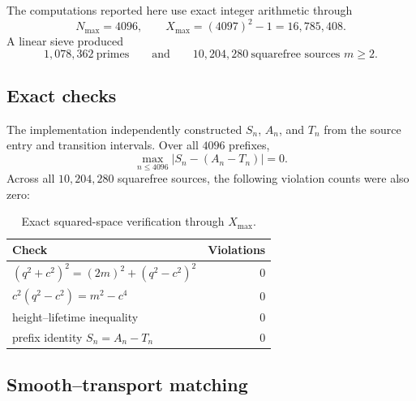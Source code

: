 \documentclass[11pt]{article}
\theoremstyle{definition}
\theoremstyle{remark}
\newcommand{\1}{\mathbf{1}}
\begin{document}
The computations reported here use exact integer arithmetic through
\begin{equation}
 N_{\max}=4096,
 \qquad
 X_{\max}=(4097)^2-1=16{,}785{,}408.
 \label{eq:numerical-range}
\end{equation}
A linear sieve produced
\begin{equation}
 1{,}078{,}362\ \text{primes}
 \qquad\text{and}\qquad
 10{,}204{,}280\ \text{squarefree sources }m\ge2.
 \label{eq:numerical-counts}
\end{equation}

\subsection{Exact checks}

The implementation independently constructed $S_n$, $A_n$, and $T_n$
from the source entry and transition intervals.  Over all $4096$
prefixes,
\begin{equation}
 \max_{n\le4096}|S_n-(A_n-T_n)|=0.
 \label{eq:exact-AT-numerical}
\end{equation}
Across all $10{,}204{,}280$ squarefree sources, the following violation
counts were also zero:

\begin{table}[htbp]
\centering
\caption{Exact squared-space verification through $X_{\max}$.}
\label{tab:exact-checks}
\small
\begin{tabular}{lr}
\toprule
Check & Violations\\
\midrule
$(q^2+c^2)^2=(2m)^2+(q^2-c^2)^2$ & 0\\
$c^2(q^2-c^2)=m^2-c^4$ & 0\\
height--lifetime inequality & 0\\
prefix identity $S_n=A_n-T_n$ & 0\\
\bottomrule
\end{tabular}
\end{table}

\subsection{Smooth--transport matching}
\end{document}
